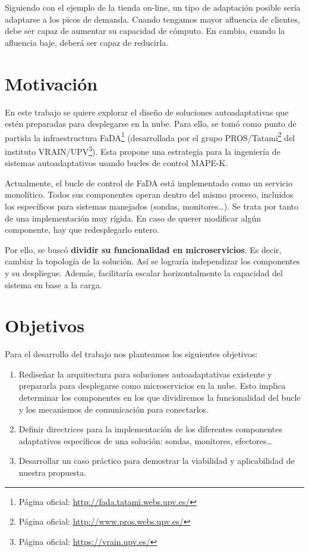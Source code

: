 Siguiendo con el ejemplo de la tienda on-line, un tipo de adaptación posible sería adaptarse a los picos de demanda. Cuando tengamos mayor afluencia de clientes, debe ser capaz de aumentar su capacidad de cómputo. En cambio, cuando la afluencia baje, deberá ser capaz de reducirla.

\section{Motivación}

En este trabajo se quiere explorar el diseño de soluciones autoadaptativas que estén preparadas para desplegarse en la nube. Para ello, se tomó como punto de partida la infraestructura FaDA\footnote{Página oficial: \url{http://fada.tatami.webs.upv.es/}} (desarrollada por el grupo PROS/Tatami\footnote{Página oficial: \url{http://www.pros.webs.upv.es/}} del instituto VRAIN/UPV\footnote{Página oficial: \url{https://vrain.upv.es/}}). Esta propone una estrategia para la ingeniería de sistemas autoadaptativos usando bucles de control MAPE-K\cite{ibmcorporationArchitecturalBlueprintAutonomic2006, fonsServiciosAdaptivereadyPara2021}.

Actualmente, el bucle de control de FaDA está implementado como un servicio monolítico. Todos sus componentes operan dentro del mismo proceso, incluidos los específicos para sistemas manejados (sondas, monitores\dots). Se trata por tanto de una implementación muy rígida. En caso de querer modificar algún componente, hay que redesplegarlo entero.

Por ello, se buscó \textbf{dividir su funcionalidad en microservicios}. Es decir, cambiar la topología de la solución. Así se lograría independizar los componentes y su despliegue. Además, facilitaría escalar horizontalmente la capacidad del sistema en base a la carga.

\section{Objetivos}

Para el desarrollo del trabajo nos planteamos los siguientes objetivos:

\begin{enumerate}
  \item Rediseñar la arquitectura para soluciones autoadaptativas existente y prepararla para desplegarse como microservicios en la nube. Esto implica determinar los componentes en los que dividiremos la funcionalidad del bucle y los mecanismos de comunicación para conectarlos.

  \item Definir directrices para la implementación de los diferentes componentes adaptativos específicos de una solución: sondas, monitores, efectores\dots

  \item Desarrollar un caso práctico para demostrar la viabilidad y aplicabilidad de nuestra propuesta.
\end{enumerate}

